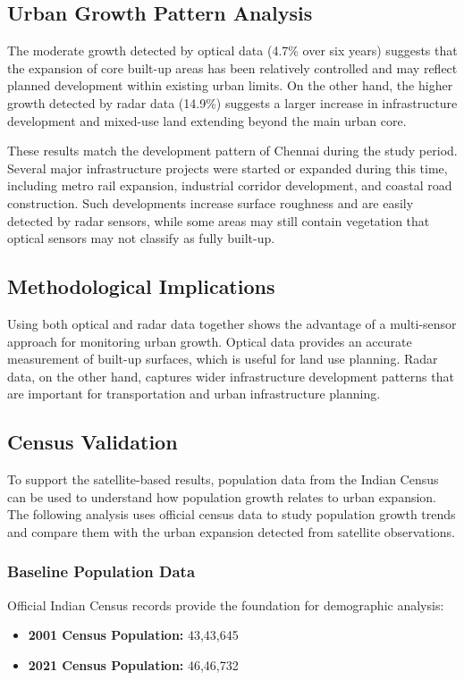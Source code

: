 \documentclass[conference]{IEEEtran}
\begin{document}
\subsection{Urban Growth Pattern Analysis}

The moderate growth detected by optical data (4.7\% over six years) suggests that the expansion of core built-up areas has been relatively controlled and may reflect planned development within existing urban limits. On the other hand, the higher growth detected by radar data (14.9\%) suggests a larger increase in infrastructure development and mixed-use land extending beyond the main urban core.

These results match the development pattern of Chennai during the study period. Several major infrastructure projects were started or expanded during this time, including metro rail expansion, industrial corridor development, and coastal road construction. Such developments increase surface roughness and are easily detected by radar sensors, while some areas may still contain vegetation that optical sensors may not classify as fully built-up.

\subsection{Methodological Implications}

Using both optical and radar data together shows the advantage of a multi-sensor approach for monitoring urban growth. Optical data provides an accurate measurement of built-up surfaces, which is useful for land use planning. Radar data, on the other hand, captures wider infrastructure development patterns that are important for transportation and urban infrastructure planning.

\subsection{Census Validation}

To support the satellite-based results, population data from the Indian Census can be used to understand how population growth relates to urban expansion. The following analysis uses official census data to study population growth trends and compare them with the urban expansion detected from satellite observations.

\subsubsection{Baseline Population Data}
Official Indian Census records provide the foundation for demographic analysis:
\begin{itemize}
    \item \textbf{2001 Census Population:} 43,43,645
    \item \textbf{2021 Census Population:} 46,46,732
\end{itemize}
\end{document}
